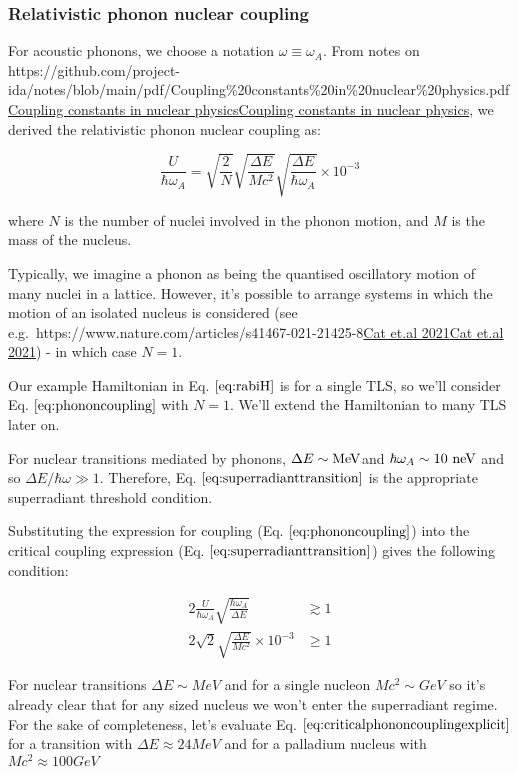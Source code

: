 \documentclass[
]{article}
\let\oldhref\href
\renewcommand{\href}[2]{\ifx#1\urlprefix\oldhref{#1}{#2}\else\uline{\oldhref{#1}{#2}}\fi}
\renewcommand{\[}{\begin{equation}}
\renewcommand{\]}{\end{equation}}
\begin{document}
\subsubsection{Relativistic phonon nuclear
coupling}\label{relativistic-phonon-nuclear-coupling}

For acoustic phonons, we choose a notation \(\omega \equiv \omega_A\).
From notes on
\href{https://github.com/project-ida/notes/blob/main/pdf/Coupling\%20constants\%20in\%20nuclear\%20physics.pdf}{Coupling
constants in nuclear physics}, we derived the relativistic phonon
nuclear coupling as:

\[
\frac{U}{\hbar \omega_A} = \sqrt{\frac{2}{N}} \sqrt{\frac{\Delta E}{M c^2}} \sqrt{\frac{\Delta E}{\hbar \omega_A}} \times 10^{-3}
\label{eq:phononcoupling}
\]

where \(N\) is the number of nuclei involved in the phonon motion, and
\(M\) is the mass of the nucleus.

Typically, we imagine a phonon as being the quantised oscillatory motion
of many nuclei in a lattice. However, it's possible to arrange systems
in which the motion of an isolated nucleus is considered (see
e.g.~\href{https://www.nature.com/articles/s41467-021-21425-8}{Cat et.al
2021}) - in which case \(N=1\).

Our example Hamiltonian in Eq. \(\ref{eq:rabiH}\) is for a single TLS,
so we'll consider Eq. \(\ref{eq:phononcoupling}\) with \(N=1\). We'll
extend the Hamiltonian to many TLS later on.

For nuclear transitions mediated by phonons,
\(\Delta E \sim \rm MeV\)and \(\hbar\omega_A \sim 10 \ \rm neV\) and so
\(\Delta E/\hbar\omega \gg 1\). Therefore, Eq.
\(\ref{eq:superradianttransition}\) is the appropriate superradiant
threshold condition.

Substituting the expression for coupling (Eq.
\(\ref{eq:phononcoupling}\)) into the critical coupling expression (Eq.
\(\ref{eq:superradianttransition}\)) gives the following condition:

\[
\begin{aligned}
2\frac{U}{\hbar\omega_A}\sqrt{\frac{\hbar\omega_A}{\Delta E}} &\gtrsim 1 \\
2\sqrt{2} \sqrt{\frac{\Delta E}{M c^2}}  \times 10^{-3} &\ge 1
\end{aligned}
\label{eq:criticalphononcouplingexplicit}
\]

For nuclear transitions \(\Delta E \sim MeV\) and for a single nucleon
\(Mc^2 \sim GeV\) so it's already clear that for any sized nucleus we
won't enter the superradiant regime. For the sake of completeness, let's
evaluate Eq. \(\ref{eq:criticalphononcouplingexplicit}\) for a
transition with \(\Delta E \approx 24MeV\) and for a palladium nucleus
with \(Mc^2 \approx 100GeV\)
\end{document}
